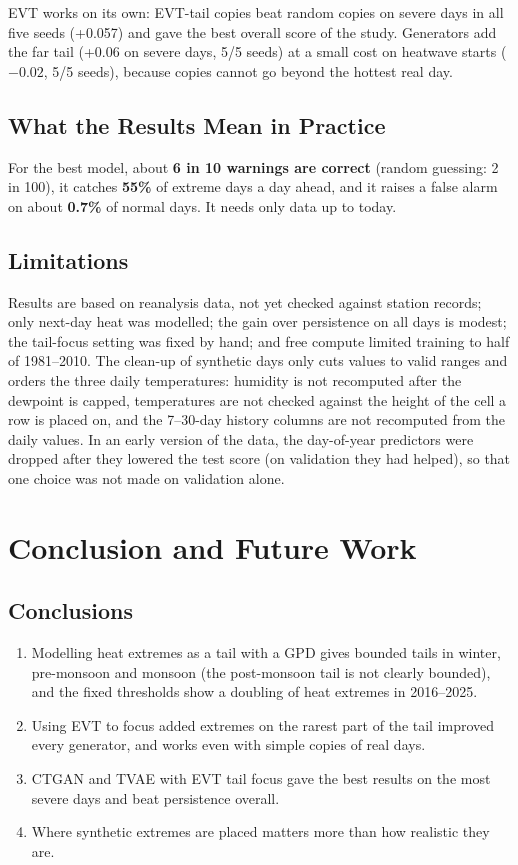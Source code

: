 \documentclass[12pt,a4paper]{report}
\begin{document}
EVT works on its own: EVT-tail copies beat random copies on severe days in all five seeds (+0.057) and gave the best
overall score of the study. Generators add the far tail (+0.06 on severe days, 5/5 seeds) at a small cost on heatwave
starts ($-0.02$, 5/5 seeds), because copies cannot go beyond the hottest real day.

\section{What the Results Mean in Practice}
For the best model, about \textbf{6 in 10 warnings are correct} (random guessing: 2 in 100), it catches \textbf{55\%}
of extreme days a day ahead, and it raises a false alarm on about \textbf{0.7\%} of normal days. It needs only data up
to today.

\section{Limitations}
\label{sec:limits}
Results are based on reanalysis data, not yet checked against station records; only next-day heat was modelled; the
gain over persistence on all days is modest; the tail-focus setting was fixed by hand; and free compute limited
training to half of 1981--2010. The clean-up of synthetic days only cuts values to valid ranges and orders the three
daily temperatures: humidity is not recomputed after the dewpoint is capped, temperatures are not checked against
the height of the cell a row is placed on, and the 7--30-day history columns are not recomputed from the daily
values. In an early version of the data, the day-of-year predictors were dropped after they lowered the test score
(on validation they had helped), so that one choice was not made on validation alone.

\chapter{Conclusion and Future Work}
\section{Conclusions}
\begin{enumerate}
  \item Modelling heat extremes as a tail with a GPD gives bounded tails in winter, pre-monsoon and monsoon (the
        post-monsoon tail is not clearly bounded), and the fixed thresholds show a doubling of heat extremes in 2016--2025.
  \item Using EVT to focus added extremes on the rarest part of the tail improved every generator, and works even with
        simple copies of real days.
  \item CTGAN and TVAE with EVT tail focus gave the best results on the most severe days and beat persistence overall.
  \item Where synthetic extremes are placed matters more than how realistic they are.
\end{enumerate}
\end{document}
